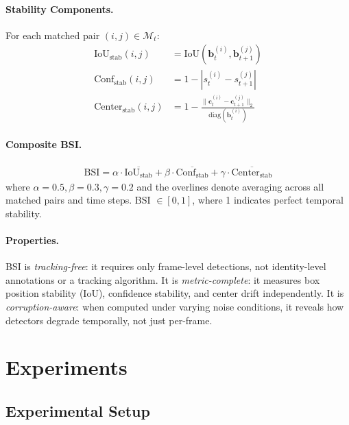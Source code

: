 \documentclass[review]{eccv2026}
\begin{document}
\paragraph{Stability Components.}
For each matched pair $(i,j) \in \mathcal{M}_t$:
\begin{align}
  \text{IoU}_\text{stab}(i,j) &= \text{IoU}(\bm{b}_t^{(i)}, \bm{b}_{t+1}^{(j)}) \label{eq:iou_stab} \\
  \text{Conf}_\text{stab}(i,j) &= 1 - |s_t^{(i)} - s_{t+1}^{(j)}| \label{eq:conf_stab} \\
  \text{Center}_\text{stab}(i,j) &= 1 - \frac{\|\bm{c}_t^{(i)} - \bm{c}_{t+1}^{(j)}\|_2}{\text{diag}(\bm{b}_t^{(i)})} \label{eq:center_stab}
\end{align}

\paragraph{Composite BSI.}
\begin{align}
  \text{BSI} = \alpha \cdot \overline{\text{IoU}_\text{stab}} + \beta \cdot \overline{\text{Conf}_\text{stab}} + \gamma \cdot \overline{\text{Center}_\text{stab}} \label{eq:bsi}
\end{align}
where $\alpha=0.5, \beta=0.3, \gamma=0.2$ and the overlines denote averaging across all matched pairs and time steps.
BSI $\in [0, 1]$, where 1 indicates perfect temporal stability.

\paragraph{Properties.}
BSI is \textit{tracking-free}: it requires only frame-level detections, not identity-level annotations or a tracking algorithm.
It is \textit{metric-complete}: it measures box position stability (IoU), confidence stability, and center drift independently.
It is \textit{corruption-aware}: when computed under varying noise conditions, it reveals how detectors degrade temporally, not just per-frame.

\section{Experiments}
\label{sec:experiments}

\subsection{Experimental Setup}
\end{document}
